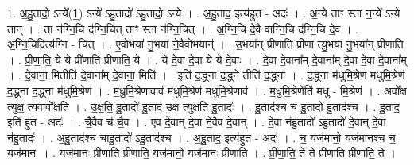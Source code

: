 \documentclass[17pt]{extarticle}
\begin{document}
1. अ॒हु॒तादो॒ ऽन्ये᳚(1॒) ऽन्ये॑ ऽहु॒तादो॑ ऽहु॒तादो॒ ऽन्ये । . अ॒हु॒ताद॒ इत्य॑हुत - अदः॑ । . अ॒न्ये ताꣳ स्ता न॒न्ये᳚ ऽन्ये तान् । . ता न॑ग्नि॒चि द॑ग्नि॒चित् ताꣳ स्ता न॑ग्नि॒चित् । . अ॒ग्नि॒चि दे॒वै वाग्नि॒चि द॑ग्नि॒चि दे॒व । . अ॒ग्नि॒चिदित्य॑ग्नि - चित् । . ए॒वोभया॑ नु॒भया॑ ने॒वैवोभयान्॑ । . उ॒भया᳚न् प्रीणाति प्रीणा त्यु॒भया॑ नु॒भया᳚न् प्रीणाति । . प्री॒णा॒ति॒ ये ये प्री॑णाति प्रीणाति॒ ये । . ये दे॒वा दे॒वा ये ये दे॒वाः । . दे॒वा दे॒वाना᳚म् दे॒वाना᳚म् दे॒वा दे॒वा दे॒वाना᳚म् । . दे॒वाना॒ मितीति॑ दे॒वाना᳚म् दे॒वाना॒ मिति॑ । . इति॑ द॒द्ध्ना द॒द्ध्ने तीति॑ द॒द्ध्ना । . द॒द्ध्ना म॑धुमि॒श्रेण॑ मधुमि॒श्रेण॑ द॒द्ध्ना द॒द्ध्ना म॑धुमि॒श्रेण॑ । . म॒धु॒मि॒श्रेणावाव॑ मधुमि॒श्रेण॑ मधुमि॒श्रेणाव॑ । . म॒धु॒मि॒श्रेणेति॑ मधु - मि॒श्रेण॑ । . अवो᳚क्ष त्युक्ष॒ त्यवावो᳚क्षति । . उ॒क्ष॒ति॒ हु॒तादो॑ हु॒ताद॑ उक्ष त्युक्षति हु॒तादः॑ । . हु॒ताद॑श्च च हु॒तादो॑ हु॒ताद॑श्च । . हु॒ताद॒ इति॑ हुत - अदः॑ । . चै॒वैव च॑ चै॒व । . ए॒व दे॒वान् दे॒वा ने॒वैव दे॒वान् । . दे॒वा न॑हु॒तादो॑ ऽहु॒तादो॑ दे॒वान् दे॒वा न॑हु॒तादः॑ । . अ॒हु॒ताद॑श्च चाहु॒तादो॑ ऽहु॒ताद॑श्च । . अ॒हु॒ताद॒ इत्य॑हुत - अदः॑ । . च॒ यज॑मानो॒ यज॑मानश्च च॒ यज॑मानः । . यज॑मानः प्रीणाति प्रीणाति॒ यज॑मानो॒ यज॑मानः प्रीणाति । . प्री॒णा॒ति॒ ते ते प्री॑णाति प्रीणाति॒ ते । \newline
\end{document}
